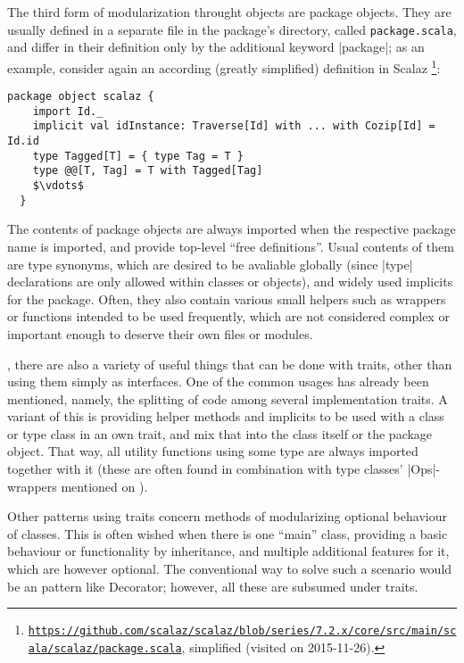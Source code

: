 The third form of modularization throught objects are package objects. They are usually defined in a
separate file in the package's directory, called \texttt{package.scala}, and differ in their
definition only by the additional keyword |package|; as an example, consider again an according
(greatly simplified) definition in Scalaz%
\footnote{%
  \protect\href{https://github.com/scalaz/scalaz/blob/0bebf537f1b37588143d303732d6a8dfbe1ef061/core/src/main/scala/scalaz/package.scala}{\nolinkurl{https://github.com/scalaz/scalaz/blob/series/7.2.x/core/src/main/scala/scalaz/package.scala}},
  simplified (visited on 2015-11-26).}:
\begin{lstlisting}[mathescape]
  package object scalaz {
    import Id._
    implicit val idInstance: Traverse[Id] with ... with Cozip[Id] = Id.id
    type Tagged[T] = { type Tag = T }
    type @@[T, Tag] = T with Tagged[Tag] 
    $\vdots$
  }
\end{lstlisting}
The contents of package objects are always imported when the respective package name is imported,
and provide top-level \enquote{free definitions}. Usual contents of them are type synonyms, which
are desired to be avaliable globally (since |type| declarations are only allowed within classes or
objects), and widely used implicits for the package. Often, they also contain various small helpers
such as wrappers or functions intended to be used frequently, which are not considered complex or
important enough to deserve their own files or modules.

, there are also a variety of useful things that
can be done with traits, other than using them simply as interfaces. One of the common usages has
already been mentioned, namely, the splitting of code among several implementation traits. A variant
of this is providing helper methods and implicits to be used with a class or type class in an own
trait, and mix that into the class itself or the package object. That way, all utility functions
using some type are always imported together with it (these are often found in combination with type
classes' |Ops|-wrappers mentioned on ).

Other patterns using traits concern methods of modularizing optional behaviour of classes. This is
often wished when there is one \enquote{main} class, providing a basic behaviour or functionality by
inheritance, and multiple additional features for it, which are however optional. The conventional
way to solve such a scenario would be an  pattern like Decorator; however, all these are
subsumed under traits.

